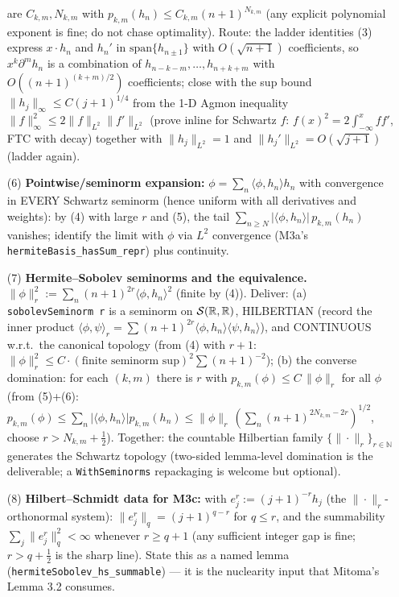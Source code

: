 \documentclass[11pt]{article}
\theoremstyle{plain}
\theoremstyle{remark}
\newcommand{\ip}[2]{\langle #1,#2\rangle}
\begin{document}
\begin{itemize}
are $C_{k,m},N_{k,m}$ with
$p_{k,m}(h_n)\le C_{k,m}(n+1)^{N_{k,m}}$ (any explicit polynomial
exponent is fine; do not chase optimality). Route: the ladder identities
(3) express $x\cdot h_n$ and $h_n'$ in $\mathrm{span}\{h_{n\pm1}\}$ with
$O(\sqrt{n+1})$ coefficients, so $x^k\partial^mh_n$ is a combination of
$h_{n-k-m},\dots,h_{n+k+m}$ with $O((n+1)^{(k+m)/2})$ coefficients;
close with the sup bound $\|h_j\|_\infty\le C(j+1)^{1/4}$ from the 1-D
Agmon inequality $\|f\|_\infty^2\le2\|f\|_{L^2}\|f'\|_{L^2}$ (prove
inline for Schwartz $f$: $f(x)^2=2\int_{-\infty}^xff'$, FTC with decay)
together with $\|h_j\|_{L^2}=1$ and $\|h_j'\|_{L^2}=O(\sqrt{j+1})$
(ladder again).
\item[(6)] \textbf{Pointwise/seminorm expansion:}
$\phi=\sum_n\ip{\phi}{h_n}h_n$ with convergence in EVERY Schwartz
seminorm (hence uniform with all derivatives and weights): by (4) with
large $r$ and (5), the tail $\sum_{n\ge N}|\ip{\phi}{h_n}|\,p_{k,m}(h_n)$
vanishes; identify the limit with $\phi$ via $L^2$ convergence (M3a's
\texttt{hermiteBasis\_hasSum\_repr}) plus continuity.
\item[(7)] \textbf{Hermite--Sobolev seminorms and the equivalence.}
$\|\phi\|_r^2:=\sum_n(n+1)^{2r}\ip{\phi}{h_n}^2$ (finite by (4)). Deliver:
(a) \texttt{sobolevSeminorm r} is a seminorm on $\mathcal{S}(\mathbb{R},\mathbb{R})$, HILBERTIAN
(record the inner product $\ip{\phi}{\psi}_r=\sum(n+1)^{2r}
\ip{\phi}{h_n}\ip{\psi}{h_n}$), and CONTINUOUS w.r.t.\ the canonical
topology (from (4) with $r+1$: $\|\phi\|_r^2\le C\cdot(\text{finite
seminorm sup})^2\sum(n+1)^{-2}$);
(b) the converse domination: for each $(k,m)$ there is $r$ with
$p_{k,m}(\phi)\le C\,\|\phi\|_r$ for all $\phi$ (from (5)+(6):
$p_{k,m}(\phi)\le\sum_n|\ip{\phi}{h_n}|p_{k,m}(h_n)\le\|\phi\|_r\,
(\sum_n(n+1)^{2N_{k,m}-2r})^{1/2}$, choose $r>N_{k,m}+\tfrac12$).
Together: the countable Hilbertian family $\{\|\cdot\|_r\}_{r\in\mathbb N}$
generates the Schwartz topology (two-sided lemma-level domination is the
deliverable; a \texttt{WithSeminorms} repackaging is welcome but
optional).
\item[(8)] \textbf{Hilbert--Schmidt data for M3c:} with
$e^r_j:=(j+1)^{-r}h_j$ (the $\|\cdot\|_r$-orthonormal system):
$\|e^r_j\|_q=(j+1)^{q-r}$ for $q\le r$, and the summability
$\sum_j\|e^r_j\|_q^2<\infty$ whenever $r\ge q+1$ (any sufficient
integer gap is fine; $r>q+\tfrac12$ is the sharp line). State this as a
named lemma (\texttt{hermiteSobolev\_hs\_summable}) --- it is the
nuclearity input that Mitoma's Lemma 3.2 consumes.
\end{itemize}
\end{document}
